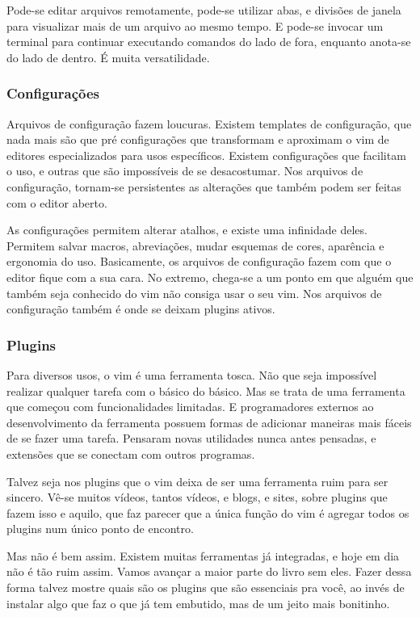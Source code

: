\documentclass[a4paper, 12pt]{article}
\begin{document}
Pode-se editar arquivos remotamente, pode-se utilizar abas,
e divisões de janela para visualizar mais de um arquivo ao mesmo tempo.
E pode-se invocar um terminal para continuar executando comandos do lado de fora, enquanto anota-se do lado de dentro.
É muita versatilidade.

\subsubsection{Configurações}
Arquivos de configuração fazem loucuras.
Existem templates de configuração, que nada mais são que pré configurações
que transformam e aproximam o vim de editores especializados para usos específicos.
Existem configurações que facilitam o uso, e outras que são impossíveis de se desacostumar.
Nos arquivos de configuração, tornam-se persistentes as alterações que também podem ser feitas com o editor aberto.

As configurações permitem alterar atalhos, e existe uma infinidade deles.
Permitem salvar macros, abreviações, mudar esquemas de cores, aparência e ergonomia do uso.
Basicamente, os arquivos de configuração fazem com que o editor fique com a sua cara.
No extremo, chega-se a um ponto em que alguém que também seja conhecido do vim não consiga usar o seu vim.
Nos arquivos de configuração também é onde se deixam plugins ativos.

\subsubsection{Plugins}
Para diversos usos, o vim é uma ferramenta tosca.
Não que seja impossível realizar qualquer tarefa com o básico do básico.
Mas se trata de uma ferramenta que começou com funcionalidades limitadas.
E programadores externos ao desenvolvimento da ferramenta possuem formas de
adicionar maneiras mais fáceis de se fazer uma tarefa.
Pensaram novas utilidades nunca antes pensadas, e extensões que se conectam com outros programas.

Talvez seja nos plugins que o vim deixa de ser uma ferramenta ruim para ser sincero.
Vê-se muitos vídeos, tantos vídeos, e blogs, e sites, sobre plugins que fazem isso e aquilo,
que faz parecer que a única função do vim é agregar todos os plugins num único ponto de encontro.

Mas não é bem assim. Existem muitas ferramentas já integradas, e hoje em dia não é tão ruim assim.
Vamos avançar a maior parte do livro sem eles.
Fazer dessa forma talvez mostre quais são os plugins que são essenciais pra você,
ao invés de instalar algo que faz o que já tem embutido, mas de um jeito mais bonitinho.
\end{document}
